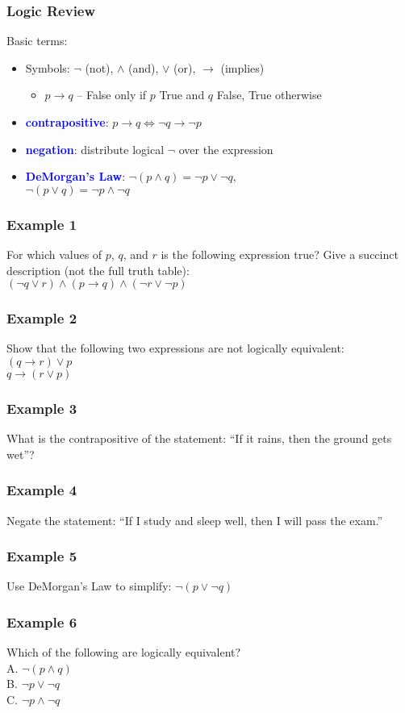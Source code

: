 \documentclass{beamer}
\begin{document}
\begin{frame}
  \frametitle{Logic Review}
  Basic terms:
  \begin{itemize}[<+->]
    \item Symbols: $\lnot$ (not), $\land$ (and), $\lor$ (or), $\to$ (implies)
    \begin{itemize}
    \item $p \to q$ -- False only if $p$ True and $q$ False, True otherwise
    \end{itemize}
    \item \textcolor{blue}{\textbf{contrapositive}}: $p \to q \iff \lnot q \to \lnot p$
    \item \textcolor{blue}{\textbf{negation}}: distribute logical $\lnot$ over the expression
    \item \textcolor{blue}{\textbf{DeMorgan's Law}}: $\lnot (p \land q) = \lnot p \lor \lnot q$, \\  $\lnot (p \lor q) = \lnot p \land \lnot q$
  \end{itemize}
\end{frame}

\begin{frame}
  \frametitle{Example 1}
  For which values of $p$, $q$, and $r$ is the following expression true? Give a succinct description (not the full truth table):\\[1ex]
  \hspace{2em} $(\lnot q \lor r) \land (p \to q) \land (\lnot r \lor \lnot p)$
\end{frame}

\begin{frame}
  \frametitle{Example 2}
  Show that the following two expressions are not logically equivalent:\\[1ex]
  \hspace{2em} $(q \to r) \lor p$\\
  \hspace{2em} $q \to (r \lor p)$
\end{frame}

\begin{frame}
  \frametitle{Example 3}
  What is the contrapositive of the statement: “If it rains, then the ground gets wet”?
\end{frame}

\begin{frame}
  \frametitle{Example 4}
  Negate the statement: “If I study and sleep well, then I will pass the exam.”
\end{frame}

\begin{frame}
  \frametitle{Example 5}
  Use DeMorgan's Law to simplify: $\lnot (p \lor \lnot q)$
\end{frame}

\begin{frame}
  \frametitle{Example 6}
  Which of the following are logically equivalent?\\
  \quad A. $\lnot (p \land q)$\\
  \quad B. $\lnot p \lor \lnot q$\\
  \quad C. $\lnot p \land \lnot q$
\end{frame}
\end{document}
